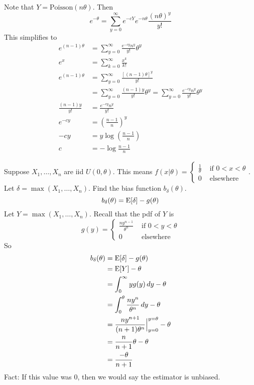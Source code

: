 \documentclass[12pt]{article}
\begin{document}
Note that $Y = \text{Poisson}(n\theta)$. Then $$ e^{-\theta} = \sum_{y=0}^\infty e^{-cY} e^{-n\theta} \frac{(n\theta)^y}{y!} $$ This simplifies to $$ \begin{aligned} e^{(n-1)\theta} &= \sum_{y=0}^\infty \frac{e^{-cy}n^y}{y!}\theta^y \\ e^x &= \sum_{k=0}^\infty \frac{x^k}{k!} \\ e^{(n-1)\theta} &= \sum_{y=0}^\infty \frac{[(n-1)\theta]^y}{y!} \\ &= \sum_{y=0}^\infty \frac{(n-1)y}{y!}\theta^y = \sum_{y=0}^\infty \frac{e^{-cy}n^y}{y!}\theta^y \\ \frac{(n-1)y}{y!} &= \frac{e^{-cy}n^y}{y!} \\ e^{-cy} &= (\frac{n-1}{n})^y \\ -cy &= y\log (\frac{n-1}{n}) \\ c &= -\log \frac{n-1}{n} \end{aligned} $$ 

Suppose $X_1,\dots,X_n$ are iid $U(0,\theta)$. This means $f(x | \theta) = \begin{cases} \frac{1}{\theta} &\text{ if } 0 < x < \theta \\ 0 &\text{ elsewhere } \end{cases} $. Let $\delta = \max(X_1,\dots,X_n)$. Find the bias function $b_\delta(\theta)$. $$ b_\delta(\theta) = \mathrm{E}[ \delta ] - g(\theta)$$ 
Let $Y = \max(X_1,\dots,X_n)$. Recall that the pdf of $Y$ is $$g(y) = \begin{cases} \frac{ny^{n-1}}{\theta^n} &\text{ if } 0 < y < \theta \\ 0 &\text{ elsewhere} \end{cases} $$ So $$ \begin{aligned} b_\delta(\theta) &= \mathrm{E}[ \delta ] - g(\theta) \\ &= \mathrm{E}[ Y ] - \theta \\ &= \int_0^\infty yg(y) \, dy - \theta \\ &= \int_0^\theta \frac{ny^n}{\theta^n} \, dy - \theta \\ &= \frac{ny^{n+1}}{(n+1)\theta^n}\Big|_{y=0}^{y=\theta} - \theta \\ &= \frac{n}{n+1}\theta - \theta \\ &= \frac{-\theta}{n+1} \end{aligned} $$ Fact: If this value was $0$, then we would say the estimator is unbiased. \\~\\
\end{document}
